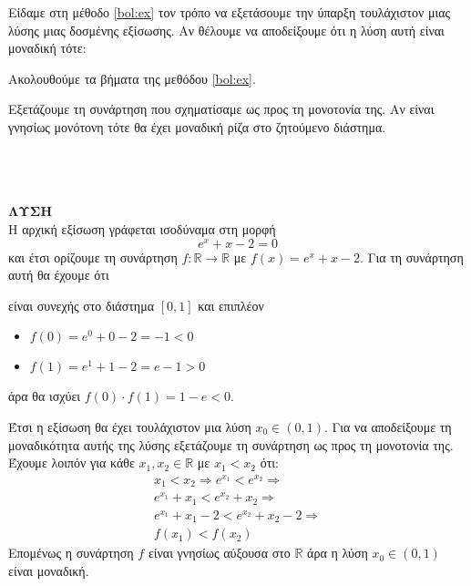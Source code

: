 \documentclass[twoside,nofonts,ektypwsh]{frontisthrio}
\begin{document}
\begin{Methodos}{7cm}
Είδαμε στη μέθοδο \ref{bol:ex} τον τρόπο να εξετάσουμε την ύπαρξη τουλάχιστον μιας λύσης μιας δοσμένης εξίσωσης. Αν θέλουμε να αποδείξουμε ότι η λύση αυτή είναι μοναδική τότε:
\begin{bhma}
\item Ακολουθούμε τα βήματα της μεθόδου \ref{bol:ex}.
\item Εξετάζουμε τη συνάρτηση που σχηματίσαμε ως προς τη μονοτονία της. Αν είναι γνησίως μονότονη τότε θα έχει μοναδική ρίζα στο ζητούμενο διάστημα.
\end{bhma}
\end{Methodos}\mbox{}\\
\\\\
\textbf{ΛΥΣΗ}\\
Η αρχική εξίσωση γράφεται ισοδύναμα στη μορφή
\[ e^x+x-2=0 \]
και έτσι ορίζουμε τη συνάρτηση $ f:\mathbb{R}\to\mathbb{R} $ με $ f(x)=e^x+x-2 $. Για τη συνάρτηση αυτή θα έχουμε ότι
\begin{rlist}
\item είναι συνεχής στο διάστημα $ [0,1] $ και επιπλέον
\item \begin{itemize}
\item $ f(0)=e^0+0-2=-1<0 $
\item $ f(1)=e^1+1-2=e-1>0 $
\end{itemize}
άρα θα ισχύει $ f(0)\cdot f(1)=1-e<0 $.
\end{rlist}
Έτσι η εξίσωση θα έχει τουλάχιστον μια λύση $ x_0\in(0,1) $. Για να αποδείξουμε τη μοναδικότητα αυτής της λύσης εξετάζουμε τη συνάρτηση ως προς τη μονοτονία της. Έχουμε λοιπόν για κάθε $ x_1,x_2\in\mathbb{R} $ με $ x_1<x_2 $ ότι:
\begin{gather*}
x_1<x_2\Rightarrow e^{x_1}<e^{x_2}\Rightarrow\\ e^{x_1}+x_1<e^{x_2}+x_2\Rightarrow\\ e^{x_1}+x_1-2<e^{x_2}+x_2-2\Rightarrow\\ f(x_1)<f(x_2)
\end{gather*}
Επομένως η συνάρτηση $ f $ είναι γνησίως αύξουσα στο $ \mathbb{R} $ άρα η λύση $ x_0\in(0,1) $ είναι μοναδική.\\\\
\end{document}
